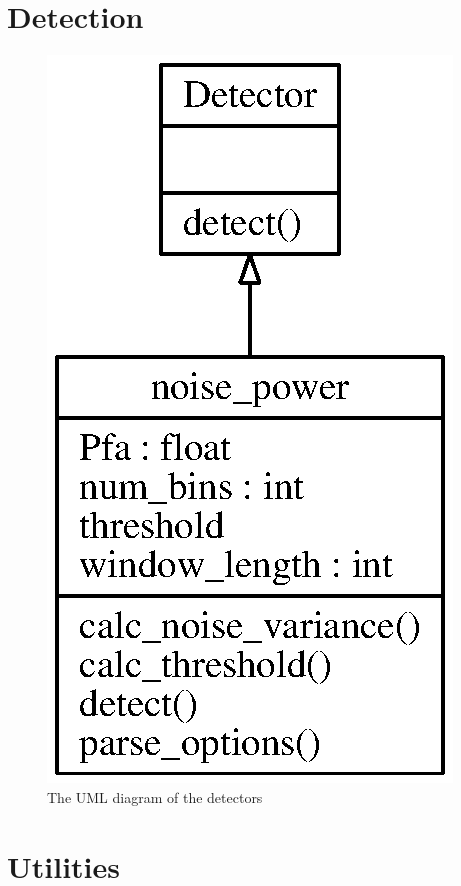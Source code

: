 \documentclass[a4paper, openany, oneside]{memoir}
\begin{document}
\section{Detection}
\label{sec:detection}

\begin{figure}
    \centering
    \includegraphics{./figures/classes_detection.eps}
    \caption{The UML diagram of the detectors}
    \label{fig:umldetector}
\end{figure}

\section{Utilities}
\label{sec:utilities}
\end{document}
